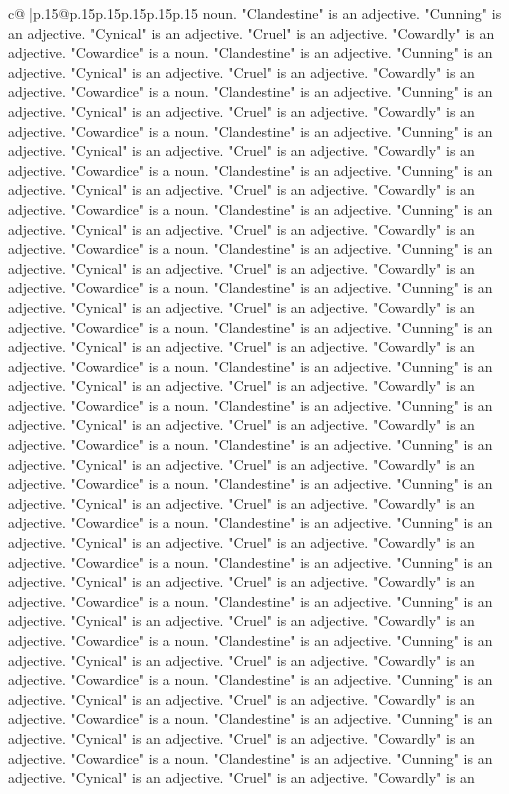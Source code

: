 \documentclass{article}
\begin{document}
{\begin{supertabular}{c@{$\;$}|p{.15\linewidth}@{}p{.15\linewidth}p{.15\linewidth}p{.15\linewidth}p{.15\linewidth}p{.15\linewidth}}
{{{noun. "Clandestine" is an adjective. "Cunning" is an adjective. "Cynical" is an adjective. "Cruel" is an adjective. "Cowardly" is an adjective. "Cowardice" is a noun. "Clandestine" is an adjective. "Cunning" is an adjective. "Cynical" is an adjective. "Cruel" is an adjective. "Cowardly" is an adjective. "Cowardice" is a noun. "Clandestine" is an adjective. "Cunning" is an adjective. "Cynical" is an adjective. "Cruel" is an adjective. "Cowardly" is an adjective. "Cowardice" is a noun. "Clandestine" is an adjective. "Cunning" is an adjective. "Cynical" is an adjective. "Cruel" is an adjective. "Cowardly" is an adjective. "Cowardice" is a noun. "Clandestine" is an adjective. "Cunning" is an adjective. "Cynical" is an adjective. "Cruel" is an adjective. "Cowardly" is an adjective. "Cowardice" is a noun. "Clandestine" is an adjective. "Cunning" is an adjective. "Cynical" is an adjective. "Cruel" is an adjective. "Cowardly" is an adjective. "Cowardice" is a noun. "Clandestine" is an adjective. "Cunning" is an adjective. "Cynical" is an adjective. "Cruel" is an adjective. "Cowardly" is an adjective. "Cowardice" is a noun. "Clandestine" is an adjective. "Cunning" is an adjective. "Cynical" is an adjective. "Cruel" is an adjective. "Cowardly" is an adjective. "Cowardice" is a noun. "Clandestine" is an adjective. "Cunning" is an adjective. "Cynical" is an adjective. "Cruel" is an adjective. "Cowardly" is an adjective. "Cowardice" is a noun. "Clandestine" is an adjective. "Cunning" is an adjective. "Cynical" is an adjective. "Cruel" is an adjective. "Cowardly" is an adjective. "Cowardice" is a noun. "Clandestine" is an adjective. "Cunning" is an adjective. "Cynical" is an adjective. "Cruel" is an adjective. "Cowardly" is an adjective. "Cowardice" is a noun. "Clandestine" is an adjective. "Cunning" is an adjective. "Cynical" is an adjective. "Cruel" is an adjective. "Cowardly" is an adjective. "Cowardice" is a noun. "Clandestine" is an adjective. "Cunning" is an adjective. "Cynical" is an adjective. "Cruel" is an adjective. "Cowardly" is an adjective. "Cowardice" is a noun. "Clandestine" is an adjective. "Cunning" is an adjective. "Cynical" is an adjective. "Cruel" is an adjective. "Cowardly" is an adjective. "Cowardice" is a noun. "Clandestine" is an adjective. "Cunning" is an adjective. "Cynical" is an adjective. "Cruel" is an adjective. "Cowardly" is an adjective. "Cowardice" is a noun. "Clandestine" is an adjective. "Cunning" is an adjective. "Cynical" is an adjective. "Cruel" is an adjective. "Cowardly" is an adjective. "Cowardice" is a noun. "Clandestine" is an adjective. "Cunning" is an adjective. "Cynical" is an adjective. "Cruel" is an adjective. "Cowardly" is an adjective. "Cowardice" is a noun. "Clandestine" is an adjective. "Cunning" is an adjective. "Cynical" is an adjective. "Cruel" is an adjective. "Cowardly" is an adjective. "Cowardice" is a noun. "Clandestine" is an adjective. "Cunning" is an adjective. "Cynical" is an adjective. "Cruel" is an adjective. "Cowardly" is an adjective. "Cowardice" is a noun. "Clandestine" is an adjective. "Cunning" is an adjective. "Cynical" is an adjective. "Cruel" is an adjective. "Cowardly" is an }}}
\end{supertabular}}
\end{document}
